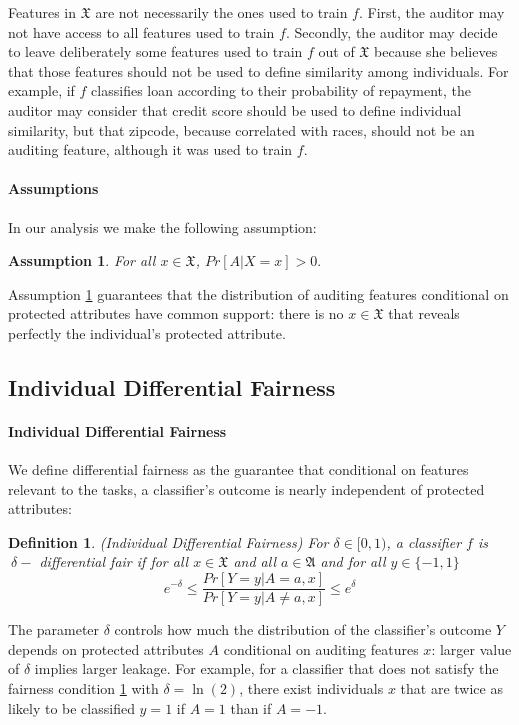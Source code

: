 \documentclass{article}
\newtheorem{assumption}{Assumption}
\newtheorem{defn}{Definition}[section]
\begin{document}
\bigskip
Features in $\mathfrak{X}$ are not necessarily the ones used to train $f$. First, the auditor may not have access to all features used to train $f$. Secondly, the auditor may decide to leave deliberately some features used to train $f$ out of $\mathfrak{X}$ because she believes that those features should not be used to define similarity among individuals. For example, if $f$ classifies loan according to their probability of repayment, the auditor may consider that credit score should be used to define individual similarity, but that zipcode, because correlated with races, should not be an auditing feature, although it was used to train $f$.  

\paragraph{Assumptions}
In our analysis we make the following assumption:
\begin{assumption}
\label{ass: 1}
For all $x\in \mathfrak{X}$, $Pr[A|X=x] > 0.$
\end{assumption}
Assumption \ref{ass: 1} guarantees that the distribution of auditing features conditional on protected attributes have common support: there is no $x\in \mathfrak{X}$ that reveals perfectly the individual's protected attribute.  

\subsection{Individual Differential Fairness}
\paragraph{Individual Differential Fairness} 
We define differential fairness as the guarantee that conditional on features relevant to the tasks, a classifier's outcome is nearly independent of protected attributes: 

\begin{defn}(Individual Differential Fairness)
\label{def: idf}
For $\delta \in [0, 1)$, a classifier $f$ is $\ \delta-$ differential fair if for all $x\in\mathfrak{X}$ and all $a\in \mathfrak{A}$ and for all $y\in\{-1, 1\}$
\begin{equation}
\label{eq: idf}
   e^{-\delta} \leq \frac{Pr[Y=y|A =a, x]}{Pr[Y=y|A\neq a, x]} \leq e^{\delta}
\end{equation}
\end{defn}

The parameter $\delta$ controls how much the distribution of the classifier's outcome $Y$ depends on protected attributes $A$ conditional on auditing features $x$: larger value of $\delta$ implies larger leakage. For example, for a classifier that does not satisfy the fairness condition \ref{def: idf} with $\delta=\ln(2)$, there exist individuals $x$ that are twice as likely to be classified $y=1$ if $A=1$ than if $A=-1$. 
\end{document}

